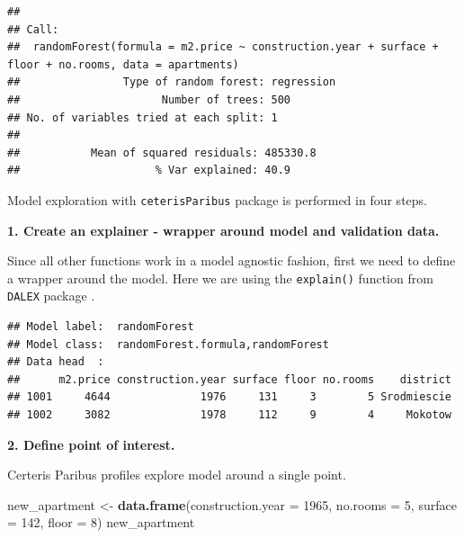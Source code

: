 \documentclass[]{krantz}
\newenvironment{Shaded}{\begin{snugshade}}{\end{snugshade}}
\newcommand{\DataTypeTok}[1]{\textcolor[rgb]{0.13,0.29,0.53}{#1}}
\newcommand{\DecValTok}[1]{\textcolor[rgb]{0.00,0.00,0.81}{#1}}
\newcommand{\KeywordTok}[1]{\textcolor[rgb]{0.13,0.29,0.53}{\textbf{#1}}}
\newcommand{\NormalTok}[1]{#1}
\newcommand{\OperatorTok}[1]{\textcolor[rgb]{0.81,0.36,0.00}{\textbf{#1}}}
\newcommand{\StringTok}[1]{\textcolor[rgb]{0.31,0.60,0.02}{#1}}
\theoremstyle{definition}
\theoremstyle{definition}
\theoremstyle{definition}
\theoremstyle{remark}
\begin{document}
\begin{verbatim}
## 
## Call:
##  randomForest(formula = m2.price ~ construction.year + surface +      floor + no.rooms, data = apartments) 
##                Type of random forest: regression
##                      Number of trees: 500
## No. of variables tried at each split: 1
## 
##           Mean of squared residuals: 485330.8
##                     % Var explained: 40.9
\end{verbatim}

Model exploration with \texttt{ceterisParibus} package is performed in
four steps.

\textbf{1. Create an explainer - wrapper around model and validation
data.}

Since all other functions work in a model agnostic fashion, first we
need to define a wrapper around the model. Here we are using the
\texttt{explain()} function from \texttt{DALEX} package \citep{R-DALEX}.

\begin{Shaded}
\end{Shaded}

\begin{verbatim}
## Model label:  randomForest 
## Model class:  randomForest.formula,randomForest 
## Data head  :
##      m2.price construction.year surface floor no.rooms    district
## 1001     4644              1976     131     3        5 Srodmiescie
## 1002     3082              1978     112     9        4     Mokotow
\end{verbatim}

\textbf{2. Define point of interest.}

Certeris Paribus profiles explore model around a single point.

\begin{Shaded}
\begin{Highlighting}[]
\NormalTok{new_apartment <-}\StringTok{ }\KeywordTok{data.frame}\NormalTok{(}\DataTypeTok{construction.year =} \DecValTok{1965}\NormalTok{, }\DataTypeTok{no.rooms =} \DecValTok{5}\NormalTok{, }\DataTypeTok{surface =} \DecValTok{142}\NormalTok{, }\DataTypeTok{floor =} \DecValTok{8}\NormalTok{)}
\NormalTok{new_apartment}
\end{Highlighting}
\end{Shaded}
\end{document}
